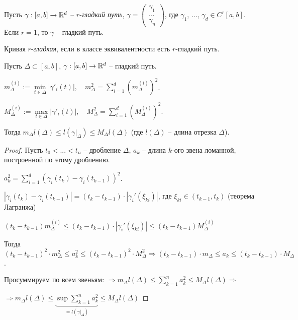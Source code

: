 \begin{definition}
    Пусть $\gamma:[a, b]\rightarrow \mathbb{R}^d$ – $r$-\textit{гладкий путь}, $\gamma=\begin{pmatrix} \gamma_1\\ ...\\ \gamma_n
    \end{pmatrix}$, где $\gamma_1$, ..., $\gamma_d\in C^r[a, b]$. Если $r=1$, то $\gamma$ – гладкий путь.
\end{definition}

\begin{definition}
    Кривая $r$-\textit{гладкая}, если в классе эквивалентности есть $r$-гладкий путь.
\end{definition}

\begin{lemma}
    Пусть $\Delta\subset [a, b]$,  $\gamma:[a, b]\rightarrow \mathbb{R}^d$ – гладкий путь. 
    
    $m_\Delta^{(i)}:=\min\limits_{t\in \Delta}|\gamma'_i(t)|,\quad m_\Delta^2=\sum\limits_{i=1}^d(m_\Delta^{(i)})^2$.
    
    $M_\Delta^{(i)}:=\max\limits_{t\in \Delta}|\gamma'_i(t)|,\quad M_\Delta^2=\sum\limits_{i=1}^d(M_\Delta^{(i)})^2$. 
    
    Тогда $m_\Delta l(\Delta)\leq l(\gamma|_\Delta)\leq M_\Delta l(\Delta)$ (где $l(\Delta)$ – длина отрезка $\Delta$).
\end{lemma}

\begin{proof}
    Пусть $t_0<...<t_n$ – дробление $\Delta$, $a_k$ – длина $k$-ого звена ломанной, построенной по этому дроблению.
    
    $a_k^2=\sum\limits_{i=1}^d(\gamma_i(t_k)-\gamma_i(t_{k-1}))^2$.

    $|\gamma_i(t_k)-\gamma_i(t_{k-1})|=(t_k-t_{k-1})\cdot |\gamma_i'(\xi_{ki})|$, где $\xi_{ki}\in (t_{k-1},t_k)$ (теорема Лагранжа)

    $(t_k-t_{k-1})m^{(i)}_\Delta\leq (t_k-t_{k-1})\cdot |\gamma_i'(\xi_{ki})|\leq (t_k-t_{k-1})M^{(i)}_\Delta$

    Тогда $(t_k-t_{k-1})^2\cdot m^{2}_\Delta\leq a_k^2\leq (t_k-t_{k-1})^2\cdot M^{2}_\Delta\Rightarrow (t_k-t_{k-1})\cdot m_\Delta\leq a_k\leq (t_k-t_{k-1})\cdot M_\Delta$.
    
    Просуммируем по всем звеньям: $\Rightarrow m_\Delta l(\Delta)\leq \sum\limits_{k=1}^n a^2_k \leq M_\Delta l(\Delta) \Rightarrow$
    
    $\Rightarrow m_\Delta l(\Delta)\leq \underbrace{\sup \sum\limits_{k=1}^n a^2_k}_{=l(\gamma|_\Delta)} \leq M_\Delta l(\Delta)$
\end{proof}

